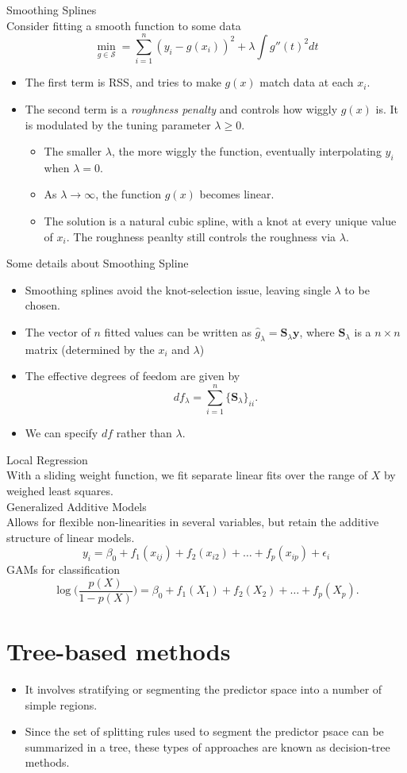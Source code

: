 \documentclass[11pt, a4paper]{article}
\begin{document}
Smoothing Splines\\
Consider fitting a smooth function to some data
\[
  \min_{g\in \mathcal{S}}=\sum_{i=1}^n(y_i-g(x_i))^2+\lambda\int g''(t)^2dt
\]
\begin{itemize}
\item The first term is RSS, and tries to make $g(x)$ match data at each $x_i$.
\item The second term is a \emph{roughness penalty} and controls how wiggly $g(x)$ is. It is modulated by the tuning parameter $\lambda\geq 0$.
  \begin{itemize}
    \item The smaller $\lambda$, the more wiggly the function, eventually interpolating $y_i$ when $\lambda=0$.
    \item As $\lambda \rightarrow \infty$, the function $g(x)$ becomes linear.
    \item The solution is a natural cubic spline, with a knot at every unique value of $x_i$. The roughness peanlty still controls the roughness via $\lambda$.
  \end{itemize}
\end{itemize}
Some details about Smoothing Spline
\begin{itemize}
  \item Smoothing splines avoid the knot-selection issue, leaving single $\lambda$ to be chosen.
  \item The vector of $n$ fitted values can be written as $\hat{g}_\lambda=\mathbf{S}_\lambda \mathbf{y}$, where $\mathbf{S}_\lambda$ is a $n\times n$ matrix (determined by the $x_i$ and $\lambda$)
\item The effective degrees of feedom are given by 
\[
  df_\lambda=\sum_{i=1}^n\{\mathbf{S}_\lambda\}_{ii}.
\]
\item We can specify $df$ rather than $\lambda$.
\end{itemize}
Local Regression\\
With a sliding weight function, we fit separate linear fits over the range of $X$ by weighed least squares.\\[1mm]
Generalized Additive Models\\
Allows for flexible non-linearities in several variables, but retain the additive structure of linear models.
\[
  y_i=\beta_0+f_1(x_{ij})+f_2(x_{i2})+\dots+f_p(x_{ip}) + \epsilon_i
\]
GAMs for classification
\[
  \log\bigg(\frac{p(X)}{1-p(X)}\bigg)=\beta_0+f_1(X_1)+f_2(X_2)+\dots+f_p(X_p).
\]
\section{Tree-based methods}
\begin{itemize}
\item It involves stratifying or segmenting the predictor space into a number of simple regions.
\item Since the set of splitting rules used to segment the predictor psace can be summarized in a tree, these types of approaches are known as decision-tree methods.
\end{itemize}
\end{document}
